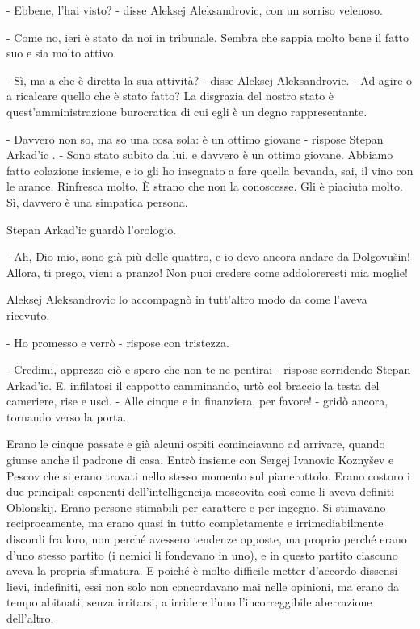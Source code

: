 - Ebbene, l'hai visto? - disse Aleksej Aleksandrovic, con un sorriso velenoso. 

- Come no, ieri è stato da noi in tribunale. Sembra che sappia molto bene il fatto suo e sia molto attivo. 

- Sì, ma a che è diretta la sua attività? - disse Aleksej Aleksandrovic. - Ad agire o a ricalcare quello che è stato fatto? La disgrazia del nostro stato è quest'amministrazione burocratica di cui egli è un degno rappresentante. 

- Davvero non so, ma so una cosa sola: è un ottimo giovane - rispose Stepan Arkad'ic . - Sono stato subito da lui, e davvero è un ottimo giovane. Abbiamo fatto colazione insieme, e io gli ho insegnato a fare quella bevanda, sai, il vino con le arance. Rinfresca molto. È strano che non la conoscesse. Gli è piaciuta molto. Sì, davvero è una simpatica persona. 

Stepan Arkad'ic guardò l'orologio. 

- Ah, Dio mio, sono già più delle quattro, e io devo ancora andare da Dolgovušin! Allora, ti prego, vieni a pranzo! Non puoi credere come addoloreresti mia moglie! 

Aleksej Aleksandrovic lo accompagnò in tutt'altro modo da come l'aveva ricevuto. 

- Ho promesso e verrò - rispose con tristezza. 

- Credimi, apprezzo ciò e spero che non te ne pentirai - rispose sorridendo Stepan Arkad'ic. E, infilatosi il cappotto camminando, urtò col braccio la testa del cameriere, rise e uscì. - Alle cinque e in finanziera, per favore! - gridò ancora, tornando verso la porta. 

Erano le cinque passate e già alcuni ospiti cominciavano ad arrivare, quando giunse anche il padrone di casa. Entrò insieme con Sergej Ivanovic Koznyšev e Pescov che si erano trovati nello stesso momento sul pianerottolo. Erano costoro i due principali esponenti dell'intelligencija moscovita così come li aveva definiti Oblonskij. Erano persone stimabili per carattere e per ingegno. Si stimavano reciprocamente, ma erano quasi in tutto completamente e irrimediabilmente discordi fra loro, non perché avessero tendenze opposte, ma proprio perché erano d'uno stesso partito (i nemici li fondevano in uno), e in questo partito ciascuno aveva la propria sfumatura. E poiché è molto difficile metter d'accordo dissensi lievi, indefiniti, essi non solo non concordavano mai nelle opinioni, ma erano da tempo abituati, senza irritarsi, a irridere l'uno l'incorreggibile aberrazione dell'altro. 

